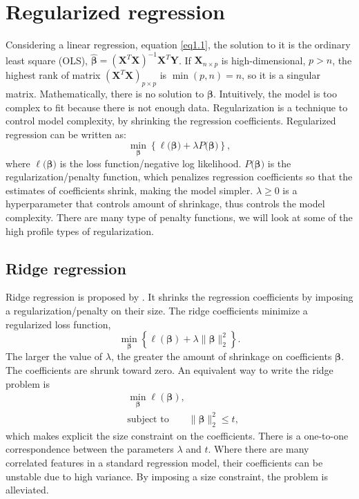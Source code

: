 \section{Regularized regression}
Considering a linear regression, equation \eqref{eq1.1}, the solution to it is the ordinary least square (OLS), $\hat{\bm{\beta}}=(\bm{X}^T\bm{X})^{-1}\bm{X}^T\bm{Y}$. If $\bm{X}_{n\times p}$ is high-dimensional, $p>n$, the highest rank of matrix $(\bm{X}^T\bm{X})_{p\times p}$ is $\min(p,n)=n$, so it is a singular matrix. Mathematically, there is no solution to $\bm{\beta}$. Intuitively, the model is too complex to fit because there is not enough data. Regularization is a technique to control model complexity, by shrinking the regression coefficients. Regularized regression can be written as:
\begin{equation}
    \min_{\bm{\beta}} \left\{\ell(\bm{\beta)} + \lambda P(\bm{\beta)}\right\}, \label{eq1.3}
\end{equation}
where $\ell(\bm{\beta)}$ is the loss function/negative log likelihood. $P(\bm{\beta)}$ is the regularization/penalty function, which penalizes regression coefficients so that the estimates of coefficients shrink, making the model simpler.  $\lambda \geq0$ is a hyperparameter that controls amount of shrinkage, thus controls the model complexity. There are many type of penalty functions, we will look at some of the high profile types of regularization.

\subsection{Ridge regression}
Ridge regression is proposed by \cite{hoerl1970ridge}. It shrinks the regression coefficients by imposing a regularization/penalty on their size. The ridge coefficients minimize a regularized loss function,
\begin{equation}
    \min_{\bm{\beta}} \left\{ \ell(\bm{\beta})+\lambda\|\bm{\beta}\|_2^2  \right\}. \label{eq1.4}
\end{equation}
The larger the value of $\lambda$, the greater the amount of shrinkage on coefficients $\bm{\beta}$. The coefficients are shrunk toward zero. An equivalent way to write the ridge problem is 
\begin{equation}
    \begin{aligned}
    &\min_{\bm{\beta}} \ell(\bm{\beta}), \\
    &\text{subject to} \qquad \|\bm{\beta}\|_2^2 \leq t, \label{eq1.5}
    \end{aligned}
\end{equation}
which makes explicit the size constraint on the coefficients. There is a one-to-one correspondence between the parameters $\lambda$ and $t$. Where there are many correlated features in a standard regression model, their coefficients can be unstable due to high variance. By imposing a size constraint, the problem is alleviated. 

